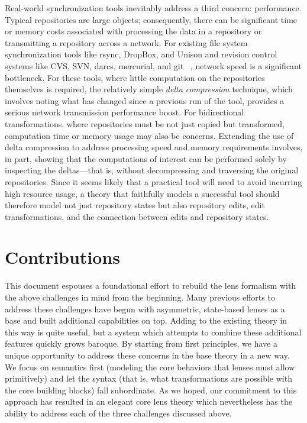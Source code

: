 Real-world synchronization tools inevitably address a third concern:
performance. Typical repositories are large objects; consequently, there can
be significant time or memory costs associated with processing the data in a
repository or transmitting a repository across a network. For existing file
system synchronization tools like rsync, DropBox, and Unison and revision
control systems like CVS, SVN, darcs, mercurial, and git~%
\cite{Tridgell96rsync,dropbox,pierce2004unison,berliner1990cvs,subversion,darcs,mercurial,git},
network speed is a significant bottleneck. For these tools, where little
computation on the repositories themselves is required, the relatively
simple \emph{delta compression} technique, which involves noting what has
changed since a previous run of the tool, provides a serious network
transmission performance boost. For bidirectional transformations, where
repositories must be not just copied but transformed, computation time or
memory usage may also be concerns. Extending the use of delta compression to
address processing speed and memory requirements involves, in part, showing
that the computations of interest can be performed solely by inspecting the
deltas---that is, without decompressing and traversing the original
repositories. Since it seems likely that a practical tool will need to avoid
incurring high resource usage, a theory that faithfully models a successful
tool should therefore model not just repository states but also repository
edits, edit transformations, and the connection between edits and repository
states.

\section{Contributions}
\label{sec:intro-contributions}
This document espouses a foundational effort to rebuild the lens formalism
with the above challenges in mind from the beginning. Many previous efforts
to address these challenges have begun with asymmetric, state-based lenses
as a base and built additional capabilities on top. Adding to the existing
theory in this way is quite useful, but a system which attempts to combine
these additional features quickly grows baroque. By starting from first
principles, we have a unique opportunity to address these concerns in the
base theory in a new way. We focus on semantics first (modeling the core
behaviors that lenses must allow primitively) and let the syntax (that is,
what transformations are possible with the core building blocks) fall
subordinate. As we hoped, our commitment to this approach has resulted in an
elegant core lens theory which nevertheless has the ability to address each
of the three challenges discussed above.

